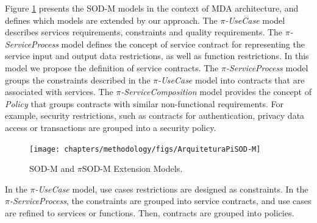 




 Figure \ref{fig:sodmExtensions} presents the SOD-M models in the context of MDA
 architecture, and defines which models are extended by our approach. The
 \textit{$\pi$-UseCase} model describes services requirements, constraints and quality requirements. The \textit{$\pi$-ServiceProcess} model defines the
concept of service contract for representing the service input and output data restrictions, as well as
function restrictions. In this model we propose the definition of service
contracts. The \textit{$\pi$-ServiceProcess} model groups the constraints
described in the \textit{$\pi$-UseCase} model into contracts that are associated
with services. The  \textit{$\pi$-ServiceComposition} model provides the concept of \textit{Policy}
 that groups contracts with similar non-functional requirements. For
example, security restrictions, such as contracts for authentication, privacy
data access or transactions are grouped into a security policy.



% 
%  

\begin{figure}[ht]
\centering
\texttt{[image: chapters/methodology/figs/ArquiteturaPiSOD-M]}
\caption{SOD-M and $\pi$SOD-M Extension Models.}
\label{fig:sodmExtensions}
\end{figure}


In the \textit{$\pi$-UseCase} model, use cases restrictions are designed as
constraints. In the \textit{$\pi$-ServiceProcess}, the constraints are grouped
into service contracts, and use cases are refined to services or functions.
Then, contracts are grouped into policies.


